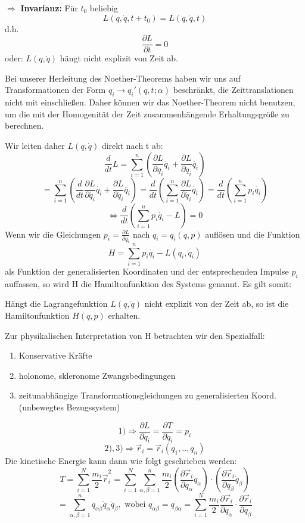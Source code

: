 \documentclass[10pt, letterpaper]{article}
\begin{document}
$\Rightarrow$ \textbf{Invarianz:} Für $t_0$ beliebig
$$L(q,\dot{q},t+t_0) = L(q,\dot{q},t)$$ 
d.h. 
$$\frac{\partial L}{\partial t} = 0$$
oder: $L(q,\dot{q})$ hängt nicht explizit von Zeit ab.


Bei unserer Herleitung des Noether-Theorems haben wir uns auf Transformationen der Form $q_i \to q_i'(q,t;\alpha)$ beschränkt, die Zeittranslationen nicht mit einschließen. Daher können wir das Noether-Theorem nicht benutzen, um die mit der Homogenität der Zeit zusammenhängende Erhaltungsgröße zu berechnen.


Wir leiten daher $L(q,\dot{q})$ direkt nach t ab:
\[\frac{d}{dt}L = \sum_{i=1}^n \left(\frac{\partial L}{\partial q_i}\dot{q_i} + \frac{\partial L}{\partial \dot{q_i}}\ddot{q_i}\right)\]
\[= \sum_{i=1}^n \left(\frac{d}{dt}\frac{\partial L}{\partial \dot{q_i}}\dot{q_i} + \frac{\partial L}{\partial \dot{q_i}}\ddot{q_i}\right) = \frac{d}{dt}\left(\sum_{i=1}^n \frac{\partial L}{\partial \dot{q_i}}\dot{q_i}\right) = \frac{d}{dt}\left(\sum_{i=1}^n p_i\dot{q_i}\right)\]
\[\Leftrightarrow \frac{d}{dt}\left(\sum_{i=1}^n p_i\dot{q_i} - L\right) = 0\]
Wenn wir die Gleichungen $p_i = \frac{\partial L}{\partial \dot{q_i}}$ nach $\dot{q_i} = \dot{q_i}(q,p)$ auflösen und die Funktion
\[H = \sum_{i=1}^n p_i\dot{q_i} - L(q_i,\dot{q_i})\]
als Funktion der generalisierten Koordinaten und der entsprechenden Impulse $p_i$ auffassen, so wird H die Hamiltonfunktion des Systems genannt. Es gilt somit:


Hängt die Lagrangefunktion $L(q,\dot{q})$ nicht explizit von der Zeit ab, so ist die Hamiltonfunktion $H(q,p)$ erhalten.

Zur physikalischen Interpretation von H betrachten wir den Spezialfall:
\begin{enumerate}
\item Konservative Kräfte
\item holonome, skleronome Zwangsbedingungen
\item zeitunabhängige Transformationsgleichungen zu generalisierten Koord. (unbewegtes Bezugssystem)
\end{enumerate}
$$1) \Rightarrow \frac{\partial L}{\partial \dot{q}_i} = \frac{\partial T}{\partial \dot{q}_i} = p_i$$
$$2),3) \Rightarrow \vec{r}_i = \vec{r}_i(q_1,..,q_n)$$
Die kinetische Energie kann dann wie folgt geschrieben werden:
\[T = \sum_{i=1}^N \frac{m_i}{2}\dot{\vec{r}}_i^2 = \sum_{i=1}^N \sum_{\alpha,\beta=1}^n \frac{m_i}{2}\left(\frac{\partial \vec{r}_i}{\partial q_\alpha}\dot{q}_\alpha\right)\cdot\left(\frac{\partial \vec{r}_i}{\partial q_\beta}\dot{q}_\beta\right)\]
\[= \sum_{\alpha,\beta=1}^n q_{\alpha\beta}\dot{q}_\alpha\dot{q}_\beta, \text{ wobei } q_{\alpha\beta} = q_{\beta\alpha} = \sum_{i=1}^N \frac{m_i}{2}\frac{\partial \vec{r}_i}{\partial q_\alpha}\cdot\frac{\partial \vec{r}_i}{\partial q_\beta}\]
\end{document}
